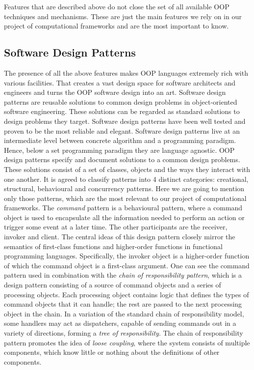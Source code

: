 \quad Features that are described above do not close the set of all available OOP techniques and mechanisms. These are just the main features we rely on in our project of computational frameworks and are the most important to know.

\subsection{Software Design Patterns}
\label{background_design}
\quad The presence of all the above features makes OOP languages extremely rich with various facilities. That creates a vast design space for software architects and engineers and turns the OOP software design into an art. Software design patterns are reusable solutions to common design problems in object-oriented software engineering. These solutions can be regarded as standard solutions to design problems they target. Software design patterns have been well tested and proven to be the most reliable and elegant.\newline\null
\quad Software design patterns live at an intermediate level between concrete algorithm and a programming paradigm. Hence, below a set programming paradigm they are language agnostic. OOP design patterns specify and document solutions to a common design problems. These solutions consist of a set of classes, objects and the ways they interact with one another. It is agreed to classify patterns into 4 distinct categories: creational, structural, behavioural and concurrency patterns. Here we are going to mention only those patterns, which are the most relevant to our project of computational frameworks.\newline\null
\quad The \textit{command} pattern is a behavioural pattern, where a command object is used to encapsulate all the information needed to perform an action or trigger some event at a later time. The other participants are the receiver, invoker and client. The central ideas of this design pattern closely mirror the semantics of first-class functions and higher-order functions in functional programming languages. Specifically, the invoker object is a higher-order function of which the command object is a first-class argument.\newline\null
\quad One can see the command pattern used in combination with the \textit{chain of responsibility pattern}, which is a design pattern consisting of a source of command objects and a series of processing objects. Each processing object contains logic that defines the types of command objects that it can handle; the rest are passed to the next processing object in the chain. In a variation of the standard chain of responsibility model, some handlers may act as dispatchers, capable of sending commands out in a variety of directions, forming a \textit{tree of responsibility}. The chain of responsibility pattern promotes the idea of \textit{loose coupling}, where the system consists of multiple components, which know little or nothing about the definitions of other components.\newline\null

